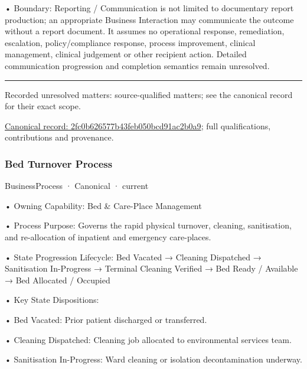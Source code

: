 •
Boundary: Reporting / Communication is not limited to documentary report production; an appropriate Business Interaction may communicate the outcome without a report document. It assumes no operational response, remediation, escalation, policy/compliance response, process improvement, clinical management, clinical judgement or other recipient action. Detailed communication progression and completion semantics remain unresolved.



\medskip\hrule\medskip

{\small Recorded unresolved matters: source-qualified matters; see the canonical record for their exact scope.}\par
{\footnotesize \href{../../../../continuum/business/business-process/2fc0b626577b43feb050bcd91ac2b0a9.md}{Canonical record: 2fc0b626577b43feb050bcd91ac2b0a9}; full qualifications, contributions and provenance.}\par
\subsubsection{Bed Turnover Process}

\label{element:69f74289926942f4baed4acf4c654a3b}
{\small BusinessProcess · Canonical · current}\par

•
Owning Capability: Bed \& Care-Place Management



•
Process Purpose: Governs the rapid physical turnover, cleaning, sanitisation, and re-allocation of inpatient and emergency care-places.



•
State Progression Lifecycle: Bed Vacated → Cleaning Dispatched → Sanitisation In-Progress → Terminal Cleaning Verified → Bed Ready / Available → Bed Allocated / Occupied



•
Key State Dispositions:



•
Bed Vacated: Prior patient discharged or transferred.



•
Cleaning Dispatched: Cleaning job allocated to environmental services team.



•
Sanitisation In-Progress: Ward cleaning or isolation decontamination underway.



